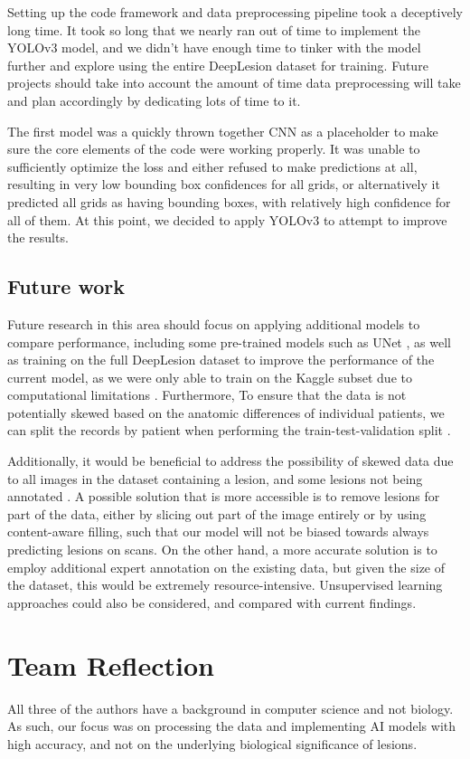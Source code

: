 Setting up the code framework and data preprocessing pipeline took a deceptively long time. It took so long that we nearly ran out of time to implement the YOLOv3 model, and we didn't have enough time to tinker with the model further and explore using the entire DeepLesion dataset for training. Future projects should take into account the amount of time data preprocessing will take and plan accordingly by dedicating lots of time to it.

The first model was a quickly thrown together CNN as a placeholder to make sure the core elements of the code were working properly. It was unable to sufficiently optimize the loss and either refused to make predictions at all, resulting in very low bounding box confidences for all grids, or alternatively it predicted all grids as having bounding boxes, with relatively high confidence for all of them. At this point, we decided to apply YOLOv3 to attempt to improve the results.

\subsection{Future work}
Future research in this area should focus on applying additional models to compare performance, including some pre-trained models such as UNet \cite{unet}, as well as training on the full DeepLesion dataset to improve the performance of the current model, as we were only able to train on the Kaggle subset due to computational limitations \cite{kaggle}. Furthermore, To ensure that the data is not potentially skewed based on the anatomic differences of individual patients, we can split the records by patient when performing the train-test-validation split \cite{chollet_deep_learning}. 

Additionally, it would be beneficial to address the possibility of skewed data due to all images in the dataset containing a lesion, and some lesions not being annotated \cite{deeplesion}. A possible solution that is more accessible is to remove lesions for part of the data, either by slicing out part of the image entirely or by using content-aware filling, such that our model will not be biased towards always predicting lesions on scans. On the other hand, a more accurate solution is to employ additional expert annotation on the existing data, but given the size of the dataset, this would be extremely resource-intensive. Unsupervised learning approaches could also be considered, and compared with current findings.


\section*{Team Reflection}
All three of the authors have a background in computer science and not biology. As such, our focus was on processing the data and implementing AI models with high accuracy, and not on the underlying biological significance of lesions.

